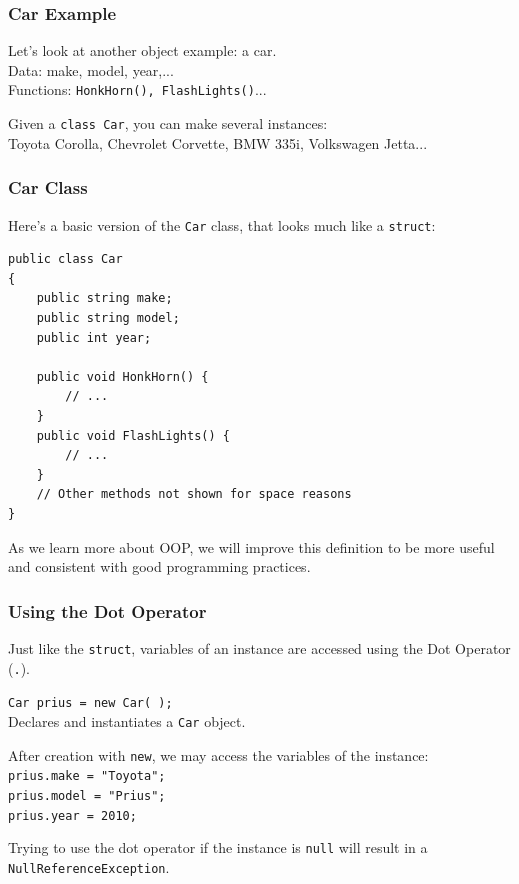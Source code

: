 \begin{frame}
\frametitle{Car Example}

Let's look at another object example: a car.\\
\quad Data: make, model, year,...\\
\quad Functions: \texttt{HonkHorn(), FlashLights()}...


Given a \texttt{class Car}, you can make several instances:\\
\quad Toyota Corolla, Chevrolet Corvette, BMW 335i, Volkswagen Jetta...

\end{frame}


\begin{frame}[fragile]
\frametitle{Car Class}

Here's a basic version of the \texttt{Car} class, that looks much like a \texttt{struct}:

{\scriptsize
\begin{verbatim}
public class Car
{
    public string make;
    public string model;
    public int year;
    
    public void HonkHorn() {
        // ...
    }
    public void FlashLights() {
        // ...
    }
    // Other methods not shown for space reasons
}
\end{verbatim}
}

As we learn more about OOP, we will improve this definition to be more useful and consistent with good programming practices.

\end{frame}

\begin{frame}
\frametitle{Using the Dot Operator}

Just like the \texttt{struct}, variables of an instance are accessed using the Dot Operator (\texttt{.}).

\texttt{Car prius = new Car( );}\\
\quad Declares and instantiates a \texttt{Car} object.

After creation with \texttt{new}, we may access the variables of the instance:\\
\quad \texttt{prius.make  = "Toyota";}\\
\quad \texttt{prius.model = "Prius";}\\
\quad \texttt{prius.year  = 2010;}

Trying to use the dot operator if the instance is \texttt{null} will result in a \texttt{NullReferenceException}.

\end{frame}


